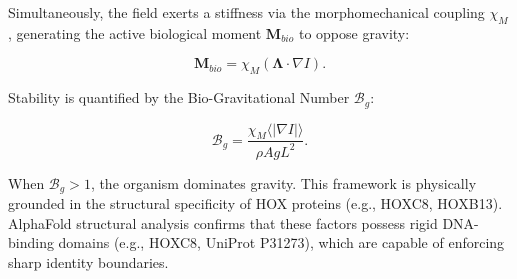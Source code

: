 Simultaneously, the field exerts a stiffness via the morphomechanical coupling $\chi_M$, generating the active biological moment $\mathbf{M}_{bio}$ to oppose gravity:

\begin{equation}
    \mathbf{M}_{bio} = \chi_M (\mathbf{\Lambda} \cdot \nabla I).
    \label{eq:active_moment}
\end{equation}

Stability is quantified by the Bio-Gravitational Number $\mathcal{B}_g$:

\begin{equation}
    \mathcal{B}_g = \frac{\chi_M \langle |\nabla I| \rangle}{\rho A g L^2}.
    \label{eq:bg_number}
\end{equation}

When $\mathcal{B}_g > 1$, the organism dominates gravity. This framework is physically grounded in the structural specificity of HOX proteins (e.g., HOXC8, HOXB13). AlphaFold structural analysis confirms that these factors possess rigid DNA-binding domains (e.g., HOXC8, UniProt P31273), which are capable of enforcing sharp identity boundaries.
